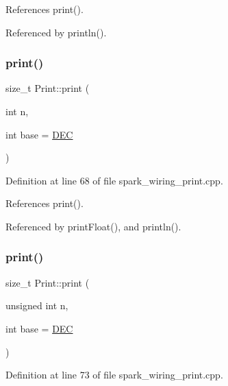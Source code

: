 References print().



Referenced by println().

\mbox{\label{class_print_a32cb3cf32d701c797b2b2d1080052dfe}} 
\subsubsection{\texorpdfstring{print()}{print()}\hspace{0.1cm}{\footnotesize\ttfamily [4/19]}}
{\footnotesize\ttfamily size\+\_\+t Print\+::print (\begin{DoxyParamCaption}\item[{int}]{n,  }\item[{int}]{base = {\ttfamily \hyperlink{docs_2src_2spark__wiring__print_8h_a26e216c38cffa0a9965fa7933ba558b1}{D\+EC}} }\end{DoxyParamCaption})}



Definition at line 68 of file spark\+\_\+wiring\+\_\+print.\+cpp.



References print().



Referenced by print\+Float(), and println().

\mbox{\label{class_print_a87275de35583868a370f43ce1c887750}} 
\subsubsection{\texorpdfstring{print()}{print()}\hspace{0.1cm}{\footnotesize\ttfamily [5/19]}}
{\footnotesize\ttfamily size\+\_\+t Print\+::print (\begin{DoxyParamCaption}\item[{unsigned int}]{n,  }\item[{int}]{base = {\ttfamily \hyperlink{docs_2src_2spark__wiring__print_8h_a26e216c38cffa0a9965fa7933ba558b1}{D\+EC}} }\end{DoxyParamCaption})}



Definition at line 73 of file spark\+\_\+wiring\+\_\+print.\+cpp.



